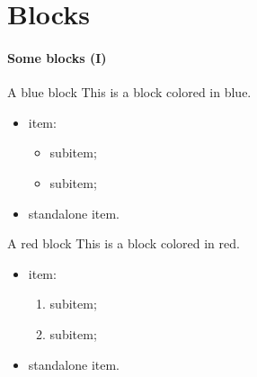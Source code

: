 \setcounter{chapter}{1}
\chapter{Blocks}

\begin{frame}
\frametitle{Some blocks (I)}
\begin{block}{A blue block}
This is a block colored in blue.

\begin{itemize}
\item {} item:
\begin{itemize}
\item {} subitem;
\item {} subitem;
\end{itemize}
\item {} standalone item.
\end{itemize}
\end{block}

\begin{alertblock}{A red block}
This is a block colored in red.

\begin{itemize}
\item {} item:
\begin{enumerate}
\item {} subitem;
\item {} subitem;
\end{enumerate}
\item {} standalone item.
\end{itemize}
\end{alertblock}
\end{frame}



